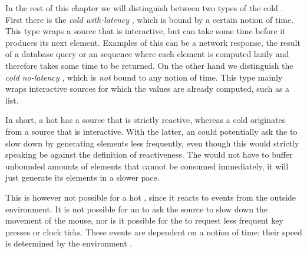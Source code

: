 In the rest of this chapter we will distinguish between two types of the cold \obs. First there is the \textit{cold with-latency \obs}, which is bound by a certain notion of time. This type wraps a source that is interactive, but can take some time before it produces its next element. Examples of this can be a network response, the result of a database query or an \ieb sequence where each element is computed lazily and therefore takes some time to be returned. On the other hand we distinguish the \textit{cold no-latency \obs}, which is \emph{not} bound to any notion of time. This type mainly wraps interactive sources for which the values are already computed, such as a list.

In short, a hot \obs has a source that is strictly reactive, whereas a cold \obs originates from a source that is interactive. With the latter, an \obv could potentially ask the \obs to slow down by generating elements less frequently, even though this would strictly speaking be against the definition of reactiveness. The \obs would not have to buffer unbounded amounts of elements that cannot be consumed immediately, it will just generate its elements in a slower pace.

This is however not possible for a hot \obs, since it reacts to events from the outside environment. It is not possible for an \obv to ask the source to slow down the movement of the mouse, nor is it possible for the \obv to request less frequent key presses or clock ticks. These events are dependent on a notion of time; their speed is determined by the environment \cite{berry1991-Reactive}.
